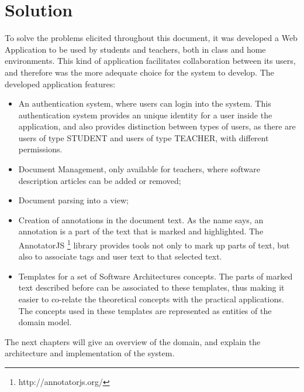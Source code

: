 
\chapter{Solution}
\label{chapter:solution}
To solve the problems elicited throughout this document, it was developed a Web Application to be used by students and teachers, both in class and home environments. This kind of application facilitates collaboration between its users, and therefore was the more adequate choice for the system to develop. The developed application features:
\begin{itemize}
\item An authentication system, where users can login into the system. This authentication system provides an unique identity for a user inside the application, and also provides distinction between types of users, as there are users of type STUDENT and users of type TEACHER, with different permissions.
\item Document Management, only available for teachers, where software description articles can be added or removed;
\item Document parsing into a view;
\item Creation of annotations in the document text. As the name says, an annotation is a part of the text that is marked and highlighted. The AnnotatorJS \footnote{http://annotatorjs.org/} library provides tools not only to mark up parts of text, but also to associate tags and user text to that selected text. 
\item Templates for a set of Software Architectures concepts. The parts of marked text described before can be associated to these templates, thus making it easier to co-relate the theoretical concepts with the practical applications. The concepts used in these templates are represented as entities of the domain model.

\end{itemize}

The next chapters will give an overview of the domain, and explain the architecture and implementation of the system.